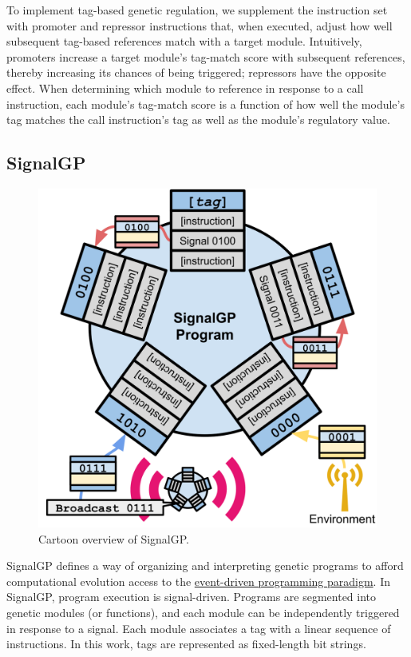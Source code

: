 \documentclass[
]{book}
\begin{document}
To implement tag-based genetic regulation, we supplement the instruction set with promoter and repressor instructions that, when executed, adjust how well subsequent tag-based references match with a target module.
Intuitively, promoters increase a target module's tag-match score with subsequent references, thereby increasing its chances of being triggered; repressors have the opposite effect.
When determining which module to reference in response to a call instruction, each module's tag-match score is a function of how well the module's tag matches the call instruction's tag as well as the module's regulatory value.

\hypertarget{signalgp}{%
\subsection{SignalGP}\label{signalgp}}

\begin{figure}
\centering
\includegraphics{./media/sgp-cartoon.png}
\caption{Cartoon overview of SignalGP.}
\end{figure}

SignalGP defines a way of organizing and interpreting genetic programs to afford computational evolution access to the \href{https://en.wikipedia.org/wiki/Event-driven_programming}{event-driven programming paradigm}.
In SignalGP, program execution is signal-driven.
Programs are segmented into genetic modules (or functions), and each module can be independently triggered in response to a signal.
Each module associates a tag with a linear sequence of instructions.
In this work, tags are represented as fixed-length bit strings.
\end{document}
